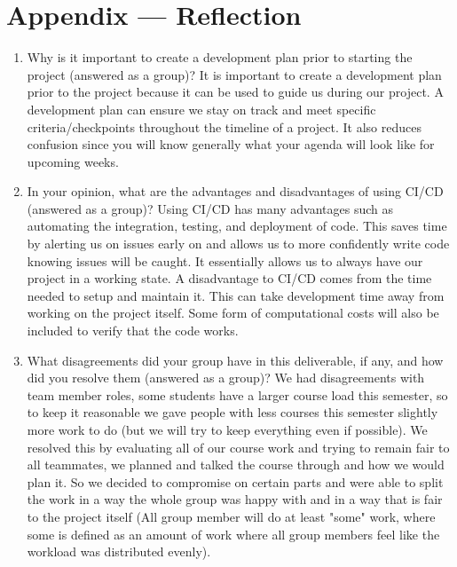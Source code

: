 \documentclass{article}
\begin{document}
\newpage{}

\section*{Appendix --- Reflection}



\begin{enumerate}
    \item Why is it important to create a development plan prior to starting the
    project (answered as a group)?
        It is important to create a development plan prior to the project 
    because it can be used to guide us during our project. A development plan can ensure
    we stay on track and meet specific criteria/checkpoints throughout the timeline 
    of a project. It also reduces confusion since you will know generally what your agenda 
    will look like for upcoming weeks. 
    \item In your opinion, what are the advantages and disadvantages of using
    CI/CD (answered as a group)?
    Using CI/CD has many advantages such as automating the integration, testing, and deployment 
    of code. This saves time by alerting us on issues early on and allows us to more confidently 
    write code knowing issues will be caught. It essentially allows us to always have our project 
    in a working state. A disadvantage to CI/CD comes from the time needed to setup and maintain it. 
    This can take development time away from working on the project itself. Some form of computational 
    costs will also be included to verify that the code works. 
    \item What disagreements did your group have in this deliverable, if any,
    and how did you resolve them (answered as a group)?
    We had disagreements with team member roles, some students have a larger
    course load this semester, so to keep it reasonable we gave people with less courses this 
    semester slightly more work to do (but we will try to keep everything even if possible). We resolved 
    this by evaluating all of our course work and trying to remain fair to all teammates, we planned and talked 
    the course through and how we would plan it. So we decided to compromise on certain parts and were able to split
    the work in a way the whole group was happy with and in a way that is fair to the project itself (All group member will do at least "some" work, where some is defined as an amount of work where all group members feel like the workload was distributed evenly).
\end{enumerate}
\end{document}
